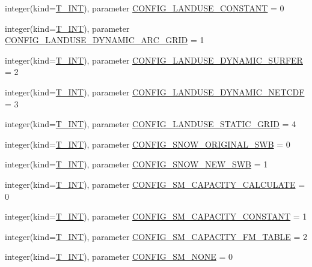\begin{DoxyCompactItemize}
\item 
integer(kind=\hyperlink{namespacetypes_a4e4d040a4425196c4d43be63e7e6103a}{T\_\-INT}), parameter \hyperlink{namespacetypes_a1bc536b5292ca49354232a3d23eb7e79}{CONFIG\_\-LANDUSE\_\-CONSTANT} = 0
\item 
integer(kind=\hyperlink{namespacetypes_a4e4d040a4425196c4d43be63e7e6103a}{T\_\-INT}), parameter \hyperlink{namespacetypes_adcf4488697f417e70c6730294b1d11ba}{CONFIG\_\-LANDUSE\_\-DYNAMIC\_\-ARC\_\-GRID} = 1
\item 
integer(kind=\hyperlink{namespacetypes_a4e4d040a4425196c4d43be63e7e6103a}{T\_\-INT}), parameter \hyperlink{namespacetypes_a953dbde53597b3e1676b05d1c09c89f7}{CONFIG\_\-LANDUSE\_\-DYNAMIC\_\-SURFER} = 2
\item 
integer(kind=\hyperlink{namespacetypes_a4e4d040a4425196c4d43be63e7e6103a}{T\_\-INT}), parameter \hyperlink{namespacetypes_a7eff03ddd24b0d84b74382dc2b48dea6}{CONFIG\_\-LANDUSE\_\-DYNAMIC\_\-NETCDF} = 3
\item 
integer(kind=\hyperlink{namespacetypes_a4e4d040a4425196c4d43be63e7e6103a}{T\_\-INT}), parameter \hyperlink{namespacetypes_a1900797780d82e576dffd4a2244c09db}{CONFIG\_\-LANDUSE\_\-STATIC\_\-GRID} = 4
\item 
integer(kind=\hyperlink{namespacetypes_a4e4d040a4425196c4d43be63e7e6103a}{T\_\-INT}), parameter \hyperlink{namespacetypes_aa50ad6a9ffea3de1d907fcde9d600afa}{CONFIG\_\-SNOW\_\-ORIGINAL\_\-SWB} = 0
\item 
integer(kind=\hyperlink{namespacetypes_a4e4d040a4425196c4d43be63e7e6103a}{T\_\-INT}), parameter \hyperlink{namespacetypes_a37b9635b00b061613505232f7f0402e9}{CONFIG\_\-SNOW\_\-NEW\_\-SWB} = 1
\item 
integer(kind=\hyperlink{namespacetypes_a4e4d040a4425196c4d43be63e7e6103a}{T\_\-INT}), parameter \hyperlink{namespacetypes_a67150551220cbe5b199d578709e71d15}{CONFIG\_\-SM\_\-CAPACITY\_\-CALCULATE} = 0
\item 
integer(kind=\hyperlink{namespacetypes_a4e4d040a4425196c4d43be63e7e6103a}{T\_\-INT}), parameter \hyperlink{namespacetypes_a36ff9b99df167660591ebadeffa4cf54}{CONFIG\_\-SM\_\-CAPACITY\_\-CONSTANT} = 1
\item 
integer(kind=\hyperlink{namespacetypes_a4e4d040a4425196c4d43be63e7e6103a}{T\_\-INT}), parameter \hyperlink{namespacetypes_a1e791678151ab504a924265e5f999d4e}{CONFIG\_\-SM\_\-CAPACITY\_\-FM\_\-TABLE} = 2
\item 
integer(kind=\hyperlink{namespacetypes_a4e4d040a4425196c4d43be63e7e6103a}{T\_\-INT}), parameter \hyperlink{namespacetypes_a95a5322e516a01cb15894b055211c626}{CONFIG\_\-SM\_\-NONE} = 0

\end{DoxyCompactItemize}
